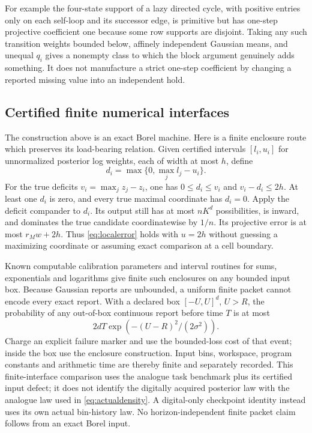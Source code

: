 For example the four-state support of a lazy directed cycle, with positive entries only on each self-loop and its successor edge, is primitive but has one-step projective coefficient one because some row supports are disjoint. Taking any such transition weights bounded below, affinely independent Gaussian means, and unequal $q_i$ gives a nonempty class to which the block argument genuinely adds something. It does not manufacture a strict one-step coefficient by changing a reported missing value into an independent hold.

\subsection{Certified finite numerical interfaces}
The construction above is an exact Borel machine. Here is a finite enclosure route which preserves its load-bearing relation. Given certified intervals $[l_i,u_i]$ for unnormalized posterior log weights, each of width at most $h$, define
\[
 d_i=\max\{0,\max_jl_j-u_i\}.
\]
For the true deficits $v_i=\max_j z_j-z_i$, one has $0\le d_i\le v_i$ and $v_i-d_i\le2h$. At least one $d_i$ is zero, and every true maximal coordinate has $d_i=0$. Apply the deficit compander to $d_i$. Its output still has at most $nK^d$ possibilities, is inward, and dominates the true candidate coordinatewise by $1/n$. Its projective error is at most $r_M w+2h$. Thus \eqref{eq:localerror} holds with $u=2h$ without guessing a maximizing coordinate or assuming exact comparison at a cell boundary.

Known computable calibration parameters and interval routines for sums, exponentials and logarithms give finite such enclosures on any bounded input box. Because Gaussian reports are unbounded, a uniform finite packet cannot encode every exact report. With a declared box $[-U,U]^d$, $U>R$, the probability of any out-of-box continuous report before time $T$ is at most
\[
 2dT\exp(-(U-R)^2/(2\sigma^2)).
\]
Charge an explicit failure marker and use the bounded-loss cost of that event; inside the box use the enclosure construction. Input bins, workspace, program constants and arithmetic time are thereby finite and separately recorded. This finite-interface comparison uses the analogue task benchmark plus its certified input defect; it does not identify the digitally acquired posterior law with the analogue law used in \eqref{eq:actualdensity}. A digital-only checkpoint identity instead uses its own actual bin-history law. No horizon-independent finite packet claim follows from an exact Borel input.
